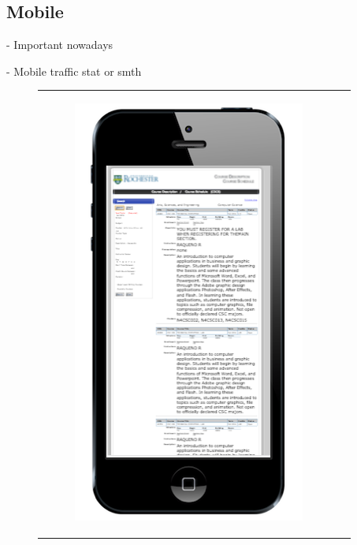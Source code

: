 \subsection{Mobile}

- Important nowadays

- Mobile traffic stat or smth

\begin{figure}[ht]
  \centering
  \begin{tabular}{c c}
    \begin{subfigure}[h]{4cm}
      \centering
      \includegraphics[width=1.00\textwidth]{images/cdcs/mobile}

\end{subfigure}
\end{tabular}
\end{figure}
